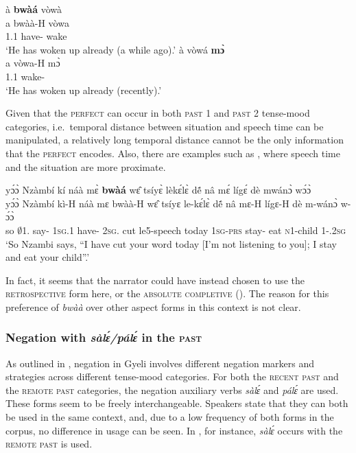 \ea\label{bwaa3}
\ea\label{bwaa3a}
  \glll    à {\bfseries bwàá} vòwà \\
            a bwàà-H vòwa\\
             1.{\PST}1  have-{\R} wake\\
    \trans `He has woken up already (a while ago).'
\ex\label{bwaa3b}
  \glll    à vòwá {\bfseries mɔ̀} \\
            a  vòwa-H mɔ̀\\
             1.{\PST}1 wake-{\R} {\COMPL}    \\
    \trans `He has woken up already (recently).'
\z
\z

Given that the \textsc{perfect} can occur in both \textsc{past 1} and \textsc{past 2} tense-mood categories, i.e.\ temporal distance between situation and speech time can be manipulated, a relatively long temporal distance cannot be the only information that the \textsc{perfect} encodes. Also, there are examples such as , where speech time and the situation are more proximate.

\ea\label{bwaa4}
  \glll  yɔ́ɔ̀ Nzàmbí kí náà mɛ̀ {\bfseries bwàá} wɛ̂ tsíyɛ̀ lèkɛ́lɛ̀ dẽ́ nâ mɛ́ lígɛ́ dè mwánɔ̀ wɔ́ɔ̀ \\
       yɔ́ɔ̀ Nzàmbí kì-H náà mɛ bwàà-H wɛ̂ tsíyɛ le-kɛ́lɛ̀ dẽ́ nâ mɛ-H lígɛ-H dè m-wánɔ̀ w-ɔ́ɔ̀ \\
         so $\emptyset$1.{\PN} say-{\R} {\COMP} 1\textsc{sg}.{\PST}1 have-{\R} 2\textsc{sg}.{\OBJ} cut le5-speech today {\COMP} 1\textsc{sg}-\textsc{prs} stay-{\R} eat \textsc{n}1-child 1-{\POSS}.2\textsc{sg}\\
    \trans `So Nzambi says, ``I have cut your word today [I'm not listening to you]; I stay and eat your child''.'
\z

\noindent In fact, it seems that the narrator could have instead chosen to use the \textsc{retrospective} form here, or the \textsc{absolute completive} (). The reason for this preference of {\itshape bwàà} over other aspect forms in this context is not clear. 









\subsubsection{Negation with {\itshape sàlɛ́/pálɛ́} in the \textsc{past}}
\label{sec:NEGPST}

As outlined in , negation in Gyeli involves different negation markers and strategies across different tense-mood categories. For both the \textsc{recent past} and the \textsc{remote past} categories,  the negation auxiliary verbs {\itshape sàlɛ́} and {\itshape pálɛ́} are used. These forms seem to be freely interchangeable. Speakers state that they can both be used in the same context, and, due to a low frequency of both forms in the corpus, no difference in usage can be seen.  In , for instance, {\itshape sàlɛ́} occurs with the \textsc{remote} \textsc{past} is used.


